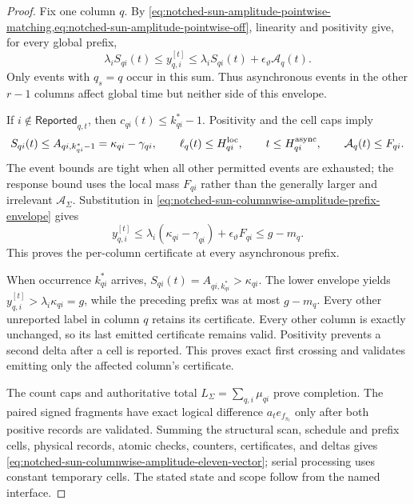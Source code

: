 \begin{proof}
Fix one column $q$.  By
\cref{eq:notched-sun-amplitude-pointwise-matching,eq:notched-sun-amplitude-pointwise-off},
linearity and positivity give, for
every global prefix,
\begin{equation}
 \lambda_iS_{qi}(t)
 \leq y_{q,i}^{[t]}
 \leq\lambda_iS_{qi}(t)+\epsilon_\vartheta\mathcal A_q(t).
 \label{eq:notched-sun-columnwise-amplitude-prefix-envelope}
\end{equation}
Only events with $q_s=q$ occur in this sum.  Thus asynchronous events in the
other $r-1$ columns affect global time but neither side of this envelope.

If $i\notin\mathsf{Reported}_{q,t}$, then
$c_{qi}(t)\leq k_{qi}^*-1$.  Positivity and the cell caps imply
\begin{equation*}
 S_{qi}(t)\leq A_{qi,k_{qi}^*-1}=\kappa_{qi}-\gamma_{qi},
 \qquad
 \ell_q(t)\leq H_{qi}^{\rm loc},
 \qquad
 t\leq H_{qi}^{\rm async},
 \qquad
 \mathcal A_q(t)\leq F_{qi}.
\end{equation*}
The event bounds are tight when all other permitted events are exhausted;
the response bound uses the local mass $F_{qi}$ rather than the generally
larger and irrelevant $\mathcal A_\Sigma$.  Substitution in
\cref{eq:notched-sun-columnwise-amplitude-prefix-envelope} gives
\begin{equation*}
 y_{q,i}^{[t]}
 \leq\lambda_i(\kappa_{qi}-\gamma_{qi})
      +\epsilon_\vartheta F_{qi}
 \leq g-m_q.
\end{equation*}
This proves the per-column certificate at every asynchronous prefix.

When occurrence $k_{qi}^*$ arrives,
$S_{qi}(t)=A_{qi,k_{qi}^*}>\kappa_{qi}$.  The lower envelope yields
$y_{q,i}^{[t]}>\lambda_i\kappa_{qi}=g$, while the preceding prefix was at
most $g-m_q$.  Every other unreported label in column $q$ retains its
certificate.  Every other column is exactly unchanged, so its last emitted
certificate remains valid.  Positivity prevents a second delta after a cell
is reported.  This proves exact first crossing and validates emitting only
the affected column's certificate.

The count caps and authoritative total $L_\Sigma=\sum_{q,i}\mu_{qi}$ prove
completion.  The paired signed fragments have exact logical difference
$a_te_{f_{\pi_t}}$ only after both positive records are validated.  Summing
the structural scan, schedule and prefix cells, physical records, atomic
checks, counters, certificates, and deltas gives
\cref{eq:notched-sun-columnwise-amplitude-eleven-vector}; serial processing
uses constant temporary cells.  The stated state and scope follow from the
named interface.
\end{proof}

